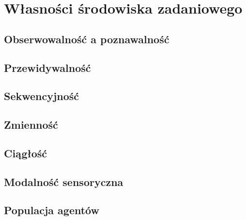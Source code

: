\section{Własności środowiska zadaniowego}
\subsection{Obserwowalność a poznawalność}
\subsection{Przewidywalność}
\subsection{Sekwencyjność}
\subsection{Zmienność}
\subsection{Ciągłość}
\subsection{Modalność sensoryczna}
\subsection{Populacja agentów}